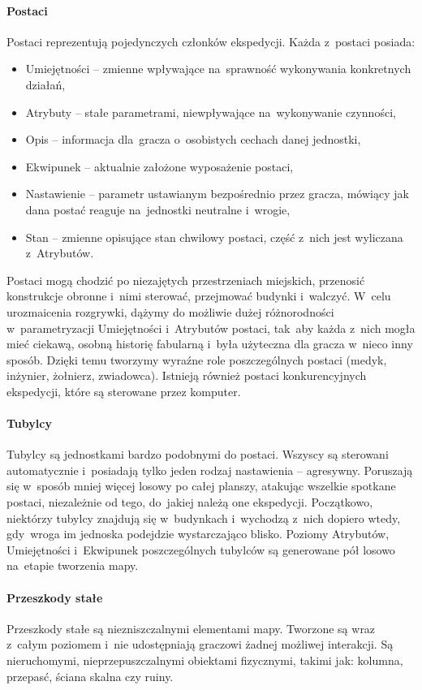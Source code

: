 \documentclass[licencjacka]{pracamgr}
\begin{document}
      \paragraph{Postaci}
	Postaci reprezentują pojedynczych członków ekspedycji. Każda z~postaci posiada:
	\begin{itemize}
	 \item Umiejętności -- zmienne wpływające na~sprawność wykonywania konkretnych działań,
	 \item Atrybuty -- stałe parametrami, niewpływające na~wykonywanie czynności,
	 \item Opis -- informacja dla~gracza o~osobistych cechach danej jednostki,
	 \item Ekwipunek -- aktualnie założone wyposażenie postaci,
	 \item Nastawienie -- parametr ustawianym bezpośrednio przez gracza, mówiący jak dana postać reaguje na~jednostki neutralne i~wrogie,
	 \item Stan -- zmienne opisujące stan chwilowy postaci, część z~nich jest wyliczana z~Atrybutów.
	\end{itemize}
	Postaci mogą chodzić po niezajętych przestrzeniach miejskich, przenosić konstrukcje obronne i~nimi sterować,
	przejmować budynki i~walczyć. W~celu urozmaicenia rozgrywki, dążymy do możliwie dużej różnorodności w~parametryzacji
	Umiejętności i~Atrybutów postaci, tak~aby każda z~nich mogła mieć ciekawą, osobną historię fabularną i~była użyteczna
	dla gracza w~nieco inny sposób. Dzięki temu tworzymy wyraźne role poszczególnych postaci (medyk, inżynier, żołnierz, zwiadowca).
	Istnieją również postaci konkurencyjnych ekspedycji, które są sterowane przez komputer.
      \paragraph{Tubylcy}
	Tubylcy są jednostkami bardzo podobnymi do postaci. Wszyscy są sterowani automatycznie i~posiadają tylko jeden rodzaj
	nastawienia -- agresywny. Poruszają się w~sposób mniej więcej losowy po całej planszy, atakując wszelkie spotkane postaci,
	niezależnie od tego, do~jakiej należą one ekspedycji. Początkowo, niektórzy tubylcy znajdują się w~budynkach i~wychodzą
	z~nich dopiero wtedy, gdy~wroga im jednoska podejdzie wystarczająco blisko. Poziomy Atrybutów, Umiejętności i~Ekwipunek poszczególnych
	tubylców są generowane pół losowo na~etapie tworzenia mapy.
      \paragraph{Przeszkody stałe}
	Przeszkody stałe są niezniszczalnymi elementami mapy. Tworzone są wraz z~całym poziomem i~nie udostępniają graczowi żadnej
	możliwej interakcji. Są nieruchomymi, nieprzepuszczalnymi obiektami fizycznymi, takimi jak: kolumna, przepasć, ściana skalna czy ruiny.
\end{document}
